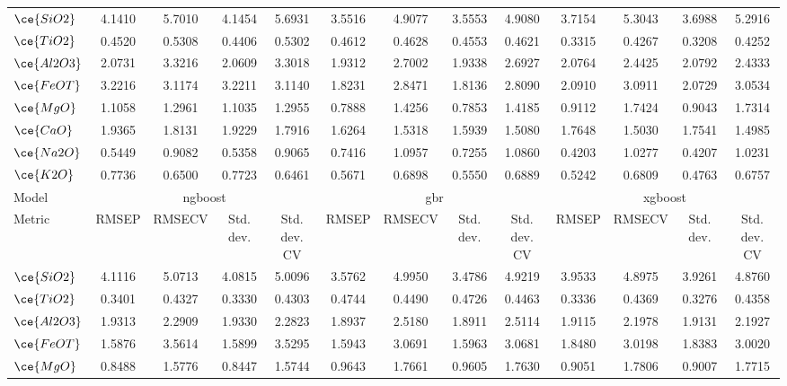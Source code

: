 \begin{table*}[]
{\begin{tabular}{l|cccc|cccc|cccc}
\hline
$\ce{SiO2}$ & 4.1410 & 5.7010 & 4.1454 & 5.6931 & 3.5516 & 4.9077 & 3.5553 & 4.9080 & 3.7154 & 5.3043 & 3.6988 & 5.2916 \\
$\ce{TiO2}$ & 0.4520 & 0.5308 & 0.4406 & 0.5302 & 0.4612 & 0.4628 & 0.4553 & 0.4621 & 0.3315 & 0.4267 & 0.3208 & 0.4252 \\
$\ce{Al2O3}$ & 2.0731 & 3.3216 & 2.0609 & 3.3018 & 1.9312 & 2.7002 & 1.9338 & 2.6927 & 2.0764 & 2.4425 & 2.0792 & 2.4333 \\
$\ce{FeOT}$ & 3.2216 & 3.1174 & 3.2211 & 3.1140 & 1.8231 & 2.8471 & 1.8136 & 2.8090 & 2.0910 & 3.0911 & 2.0729 & 3.0534 \\
$\ce{MgO}$ & 1.1058 & 1.2961 & 1.1035 & 1.2955 & 0.7888 & 1.4256 & 0.7853 & 1.4185 & 0.9112 & 1.7424 & 0.9043 & 1.7314 \\
$\ce{CaO}$ & 1.9365 & 1.8131 & 1.9229 & 1.7916 & 1.6264 & 1.5318 & 1.5939 & 1.5080 & 1.7648 & 1.5030 & 1.7541 & 1.4985 \\
$\ce{Na2O}$ & 0.5449 & 0.9082 & 0.5358 & 0.9065 & 0.7416 & 1.0957 & 0.7255 & 1.0860 & 0.4203 & 1.0277 & 0.4207 & 1.0231 \\
$\ce{K2O}$ & 0.7736 & 0.6500 & 0.7723 & 0.6461 & 0.5671 & 0.6898 & 0.5550 & 0.6889 & 0.5242 & 0.6809 & 0.4763 & 0.6757 \\
\hline
Model & \multicolumn{4}{c}{\gls{ngboost}} & \multicolumn{4}{c}{\gls{gbr}} & \multicolumn{4}{c}{\gls{xgboost}} \\
Metric & \multicolumn{1}{c}{RMSEP} & \multicolumn{1}{c}{RMSECV} & \multicolumn{1}{c}{Std. dev.} & \multicolumn{1}{c}{Std. dev. CV} & \multicolumn{1}{c}{RMSEP} & \multicolumn{1}{c}{RMSECV} & \multicolumn{1}{c}{Std. dev.} & \multicolumn{1}{c}{Std. dev. CV} & \multicolumn{1}{c}{RMSEP} & \multicolumn{1}{c}{RMSECV} & \multicolumn{1}{c}{Std. dev.} & \multicolumn{1}{c}{Std. dev. CV} \\
\hline
$\ce{SiO2}$ & 4.1116 & 5.0713 & 4.0815 & 5.0096 & 3.5762 & 4.9950 & 3.4786 & 4.9219 & 3.9533 & 4.8975 & 3.9261 & 4.8760 \\
$\ce{TiO2}$ & 0.3401 & 0.4327 & 0.3330 & 0.4303 & 0.4744 & 0.4490 & 0.4726 & 0.4463 & 0.3336 & 0.4369 & 0.3276 & 0.4358 \\
$\ce{Al2O3}$ & 1.9313 & 2.2909 & 1.9330 & 2.2823 & 1.8937 & 2.5180 & 1.8911 & 2.5114 & 1.9115 & 2.1978 & 1.9131 & 2.1927 \\
$\ce{FeOT}$ & 1.5876 & 3.5614 & 1.5899 & 3.5295 & 1.5943 & 3.0691 & 1.5963 & 3.0681 & 1.8480 & 3.0198 & 1.8383 & 3.0020 \\
$\ce{MgO}$ & 0.8488 & 1.5776 & 0.8447 & 1.5744 & 0.9643 & 1.7661 & 0.9605 & 1.7630 & 0.9051 & 1.7806 & 0.9007 & 1.7715 \\

\end{tabular}}
\end{table*}
